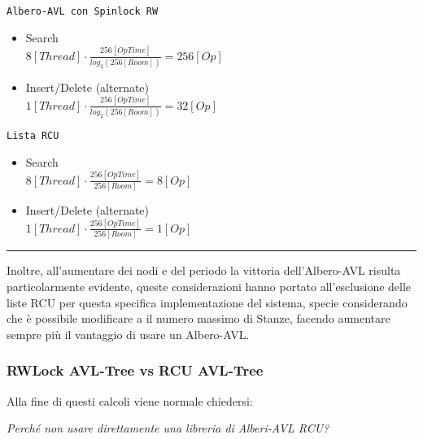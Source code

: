\begin{minipage}{0.45\linewidth}
\begin{center}
\texttt{Albero-AVL con Spinlock RW}
\end{center}
\begin{itemize}
 \item[\faSmileO] Search \\
 $8 [Thread] \cdot \frac{256 [OpTime]}{log_2(256 [Room])} = 256 [Op]$

 \item[\faSmileO] Insert/Delete (alternate) \\
 $1 [Thread] \cdot \frac{256 [OpTime]}{log_2(256 [Room])} = 32 [Op]$
\end{itemize}
\end{minipage}
\hfill
\begin{minipage}{0.45\linewidth}
\begin{center}
\texttt{Lista RCU}
\end{center}
\begin{itemize}
 \item[\faFrownO] Search\\
  $8 [Thread] \cdot \frac{256 [OpTime]}{256 [Room]} = 8 [Op]$
 \item[\faFrownO] Insert/Delete (alternate) \\
  $1 [Thread] \cdot \frac{256 [OpTime]}{256 [Room]} = 1 [Op]$
\end{itemize}
\end{minipage}

\rule{\linewidth}{0.5pt}

Inoltre, all'aumentare dei nodi e del periodo la vittoria dell'Albero-AVL risulta particolarmente evidente, queste
considerazioni hanno portato all'esclusione delle liste RCU per questa specifica implementazione del sistema, specie
considerando che è possibile modificare a \RunTime il numero massimo di Stanze, facendo aumentare sempre più il
vantaggio di usare un Albero-AVL.

\subsubsection{RWLock AVL-Tree vs RCU AVL-Tree} \label{AVL_Vs_RCUAvl}

Alla fine di questi calcoli viene normale chiedersi:

\begin{center}
\textit{Perché non usare direttamente una libreria di Alberi-AVL RCU?}
\end{center}

